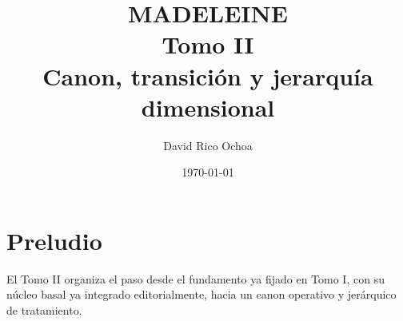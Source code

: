 \documentclass[11pt,oneside]{book}
\begin{document}
\frontmatter
\title{MADELEINE \\ Tomo II \\ Canon, transición y jerarquía dimensional}
\author{David Rico Ochoa}
\date{\today}
\maketitle
\tableofcontents
\mainmatter

\chapter{Preludio}
El Tomo II organiza el paso desde el fundamento ya fijado en Tomo I, con su núcleo basal ya integrado editorialmente, hacia un canon operativo y jerárquico de tratamiento.
















\end{document}
